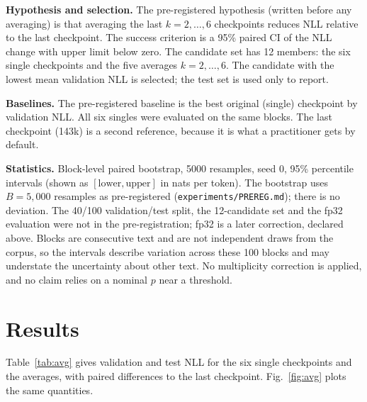 \documentclass[conference]{IEEEtran}
\begin{document}
\textbf{Hypothesis and selection.} The pre-registered hypothesis (written before any averaging) is that averaging the last $k=2,\dots,6$ checkpoints reduces NLL relative to the last checkpoint. The success criterion is a 95\% paired CI of the NLL change with upper limit below zero. The candidate set has 12 members: the six single checkpoints and the five averages $k=2,\dots,6$. The candidate with the lowest mean validation NLL is selected; the test set is used only to report.

\textbf{Baselines.} The pre-registered baseline is the best original (single) checkpoint by validation NLL. All six singles were evaluated on the same blocks. The last checkpoint (143k) is a second reference, because it is what a practitioner gets by default.

\textbf{Statistics.} Block-level paired bootstrap, 5000 resamples, seed 0, 95\% percentile intervals (shown as $[\text{lower},\text{upper}]$ in nats per token). The bootstrap uses $B=5{,}000$ resamples as pre-registered (\texttt{experiments/PREREG.md}); there is no deviation. The 40/100 validation/test split, the 12-candidate set and the fp32 evaluation were not in the pre-registration; fp32 is a later correction, declared above. Blocks are consecutive text and are not independent draws from the corpus, so the intervals describe variation across these 100 blocks and may understate the uncertainty about other text. No multiplicity correction is applied, and no claim relies on a nominal $p$ near a threshold.

\section{Results}
Table~\ref{tab:avg} gives validation and test NLL for the six single checkpoints and the averages, with paired differences to the last checkpoint. Fig.~\ref{fig:avg} plots the same quantities.
\end{document}
